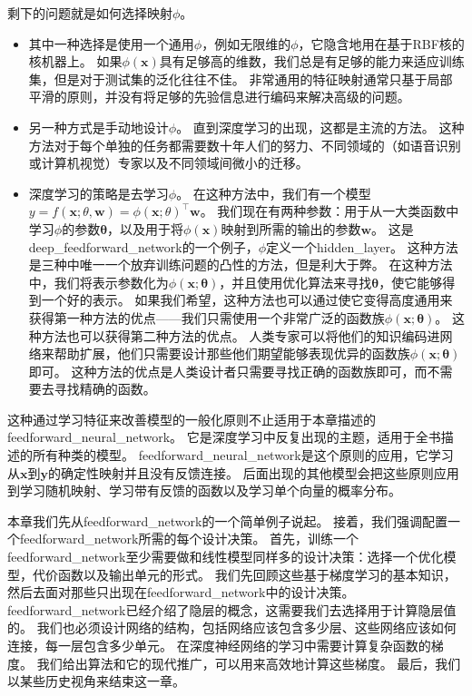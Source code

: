 剩下的问题就是如何选择映射$\phi$。
\begin{itemize}
\item 其中一种选择是使用一个通用$\phi$，例如无限维的$\phi$，它隐含地用在基于RBF核的核机器上。
如果$\phi(\bm{x})$具有足够高的维数，我们总是有足够的能力来适应训练集，但是对于测试集的泛化往往不佳。
非常通用的特征映射通常只基于局部平滑的原则，并没有将足够的先验信息进行编码来解决高级的问题。

\item 另一种方式是手动地设计$\phi$。
直到深度学习的出现，这都是主流的方法。
这种方法对于每个单独的任务都需要数十年人们的努力、不同领域的（如语音识别或计算机视觉）专家以及不同领域间微小的迁移。

\item 深度学习的策略是去学习$\phi$。
在这种方法中，我们有一个模型$y = f(\bm{x};\theta, \bm{w}) = \phi(\bm{x}; \theta)^\top \bm{w}$。
我们现在有两种参数：用于从一大类函数中学习$\phi$的参数$\bm{\theta}$，以及用于将$\phi(\bm{x})$映射到所需的输出的参数$\bm{w}$。
这是\gls{deep_feedforward_network}的一个例子，$\phi$定义一个\gls{hidden_layer}。
这种方法是三种中唯一一个放弃训练问题的凸性的方法，但是利大于弊。
在这种方法中，我们将表示参数化为$\phi(\bm{x}; \bm{\theta})$，并且使用优化算法来寻找$\bm{\theta}$，使它能够得到一个好的表示。
如果我们希望，这种方法也可以通过使它变得高度通用来获得第一种方法的优点——我们只需使用一个非常广泛的函数族$\phi(\bm{x}; \bm{\theta})$。
这种方法也可以获得第二种方法的优点。
人类专家可以将他们的知识编码进网络来帮助扩展，他们只需要设计那些他们期望能够表现优异的函数族$\phi(\bm{x}; \bm{\theta})$即可。
这种方法的优点是人类设计者只需要寻找正确的函数族即可，而不需要去寻找精确的函数。
\end{itemize}

这种通过学习特征来改善模型的一般化原则不止适用于本章描述的\gls{feedforward_neural_network}。
它是深度学习中反复出现的主题，适用于全书描述的所有种类的模型。
\gls{feedforward_neural_network}是这个原则的应用，它学习从$\bm{x}$到$\bm{y}$的确定性映射并且没有反馈连接。
后面出现的其他模型会把这些原则应用到学习随机映射、学习带有反馈的函数以及学习单个向量的概率分布。


本章我们先从\gls{feedforward_network}的一个简单例子说起。
接着，我们强调配置一个\gls{feedforward_network}所需的每个设计决策。
首先，训练一个\gls{feedforward_network}至少需要做和线性模型同样多的设计决策：选择一个优化模型，代价函数以及输出单元的形式。
我们先回顾这些基于梯度学习的基本知识，然后去面对那些只出现在\gls{feedforward_network}中的设计决策。
\gls{feedforward_network}已经介绍了隐层的概念，这需要我们去选择用于计算隐层值的。
我们也必须设计网络的结构，包括网络应该包含多少层、这些网络应该如何连接，每一层包含多少单元。
在深度神经网络的学习中需要计算复杂函数的梯度。
我们给出算法和它的现代推广，可以用来高效地计算这些梯度。
最后，我们以某些历史视角来结束这一章。

